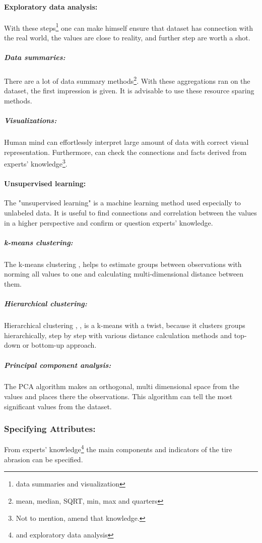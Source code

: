 		\paragraph{Exploratory data analysis:}
			With these steps\footnote{data summaries and visualization} one can make himself ensure that dataset has connection with the real world, the values are close to reality, and further step are worth a shot.
			\subparagraph{Data summaries:}
			There are a lot of data summary methods\footnote{mean, median, SQRT, min, max and quarters}. With these aggregations ran on the dataset, the first impression is given. It is advisable to use these resource sparing methods.
			\subparagraph{Visualizations:}
			Human mind can effortlessly interpret large amount of data with correct visual representation. Furthermore, can check the connections and facts derived from experts' knowledge\footnote{Not to mention, amend that knowledge.}. 
		\paragraph{Unsupervised learning:}
		The "unsupervised learning" \cite{UnsuplearnBook} is a machine learning method used especially to unlabeled data. It is useful to find connections and correlation between the values in a higher perspective and confirm or question experts' knowledge.
			\subparagraph{k-means clustering:}
			The k-means clustering \cite{k-means}, \cite{kmeans2} helps to estimate groups between observations with norming all values to one and calculating multi-dimensional distance between them.
			\subparagraph{Hierarchical clustering:}
			Hierarchical clustering \cite{h-clust}, \cite{h-clust2}, \cite{Clustering} is a k-means with a twist, because it clusters groups hierarchically, step by step with various distance calculation methods and top-down or bottom-up approach.
			\subparagraph{Principal component analysis:}
			The PCA \cite{PCA} algorithm makes an orthogonal, multi dimensional space from the values and places there the observations. This algorithm can tell the most significant values from the dataset.
	\subsubsection{Specifying Attributes:}
	From experts' knowledge\footnote{and exploratory data analysis} the main components and indicators of the tire abrasion can be specified.

